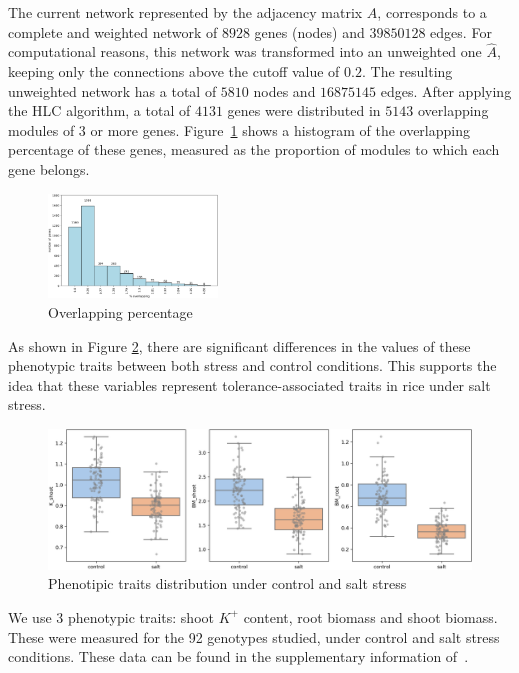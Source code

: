 \documentclass[12pt,journal, onecolumn]{IEEEtran}
\begin{document}
The current network represented by the adjacency matrix $A$, corresponds to a complete and weighted network of $8928$ genes (nodes) and $39850128$ edges. For computational reasons, this network was transformed into an unweighted one $\hat{A}$, keeping only the connections above the cutoff value of $0.2$. The resulting unweighted network has a total of $5810$ nodes and $16875145$ edges. After applying the HLC algorithm, a total of $4131$ genes were distributed in $5143$ overlapping modules of $3$ or more genes. Figure~\ref{fig:overlap} shows a histogram of the overlapping percentage of these genes, measured as the proportion of modules to which each gene belongs.

\begin{figure}[h]
  \centering
    \includegraphics[clip,width=0.4\textwidth]{Figures/artificial_modules.png}
  \caption{Overlapping percentage}
  \label{fig:overlap}
\end{figure}

As shown in Figure \ref{fig:pdata}, there are significant differences in the values of these phenotypic traits between both stress and control conditions. This supports the idea that these variables represent tolerance-associated traits in rice under salt stress.

\begin{figure}[h]
  \centering
    \includegraphics[clip,width=1\textwidth]{Figures/phenotypic_traits.png}
  \caption{Phenotipic traits distribution under control and salt stress}
  \label{fig:pdata}
\end{figure}

We use 3 phenotypic traits: shoot $K^+$ content, root biomass and shoot biomass. These were measured for the 92 genotypes studied, under  control and salt stress conditions. These data can be found in the supplementary information of~\cite{campbell2017allelic}.\\
\end{document}
